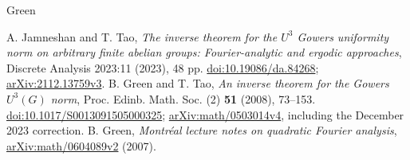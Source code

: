 \documentclass[11pt,a4paper]{article}
\theoremstyle{definition}
\numberwithin{equation}{section}
\begin{document}
\begin{thebibliography}{Green}
\raggedright
{}
A. Jamneshan and T. Tao,
\emph{The inverse theorem for the $U^3$ Gowers uniformity norm on arbitrary
finite abelian groups: Fourier-analytic and ergodic approaches},
Discrete Analysis 2023:11 (2023), 48 pp.
\href{https://doi.org/10.19086/da.84268}{doi:10.19086/da.84268};
\href{https://arxiv.org/abs/2112.13759v3}{arXiv:2112.13759v3}.
B. Green and T. Tao,
\emph{An inverse theorem for the Gowers $U^3(G)$ norm},
Proc. Edinb. Math. Soc. (2) \textbf{51} (2008), 73--153.
\href{https://doi.org/10.1017/S0013091505000325}{doi:10.1017/S0013091505000325};
\href{https://arxiv.org/abs/math/0503014v4}{arXiv:math/0503014v4},
including the December 2023 correction.
B. Green,
\emph{Montr\'eal lecture notes on quadratic Fourier analysis},
\href{https://arxiv.org/abs/math/0604089v2}{arXiv:math/0604089v2} (2007).
\end{thebibliography}
\end{document}
